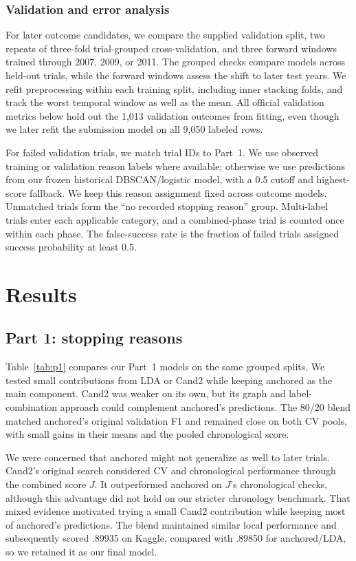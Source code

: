 \documentclass[10pt,twocolumn,letterpaper]{article}
\begin{document}
\subsubsection{Validation and error analysis}

For later outcome candidates, we compare the supplied validation split,
two repeats of three-fold trial-grouped cross-validation, and three forward
windows trained through 2007, 2009, or 2011. The grouped checks compare models
across held-out trials, while the forward windows assess the shift to later
test years. We refit preprocessing within each training
split, including inner stacking folds, and track the worst temporal window as
well as the mean. All official validation metrics below hold out the 1,013
validation outcomes from fitting, even though we later refit the submission
model on all 9,050 labeled rows.

For failed validation trials, we match trial IDs to Part~1. We use observed
training or validation reason labels where available; otherwise we use
predictions from our frozen historical DBSCAN/logistic model, with a 0.5 cutoff
and highest-score fallback. We keep this reason assignment fixed across outcome
models. Unmatched trials form the ``no recorded stopping reason'' group.
Multi-label trials enter each applicable category, and a combined-phase trial
is counted once within each phase. The false-success rate is the fraction of
failed trials assigned success probability at least 0.5.

\section{Results}
\label{sec:results}

\subsection{Part 1: stopping reasons}

Table~\ref{tab:p1} compares our Part~1 models on the same grouped splits.
We tested small contributions from LDA or Cand2 while keeping anchored as the
main component. Cand2 was weaker on its own, but its graph and label-combination
approach could complement anchored's predictions. The 80/20 blend matched
anchored's original validation F1 and remained close on both CV pools, with
small gains in their means and the pooled chronological score.

We were concerned that anchored might not generalize as well to later trials.
Cand2's original search considered CV and chronological performance through
the combined score $J$. It outperformed anchored on $J$'s chronological checks,
although this advantage did not hold on our stricter chronology benchmark.
That mixed evidence motivated trying a small Cand2 contribution while keeping
most of anchored's predictions. The blend maintained similar local performance
and subsequently scored .89935 on Kaggle, compared with .89850 for
anchored/LDA, so we retained it as our final model.
\end{document}
